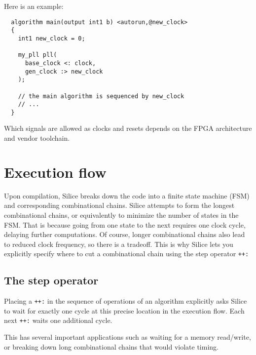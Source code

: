 \documentclass[a4]{article}
\newcommand\silice{Silice}
\begin{document}
Here is an example:
\begin{verbatim}
  algorithm main(output int1 b) <autorun,@new_clock>
  {
    int1 new_clock = 0;

    my_pll pll(
      base_clock <: clock,
      gen_clock :> new_clock
    );

    // the main algorithm is sequenced by new_clock
    // ...
  }
\end{verbatim}

Which signals are allowed as clocks and resets depends on the FPGA architecture
and vendor toolchain.



\section{Execution flow}
\label{sec:execflow}

Upon compilation, \silice{} breaks down the code into a finite state machine (FSM) and corresponding combinational chains.
%
\silice{} attempts to form the longest combinational chains, or equivalently
to minimize the number of states in the FSM. That is because going from one state 
to the next requires one clock cycle, delaying further computations. 
%
Of course, longer combinational chains also lead to reduced clock frequency, so
there is a tradeoff. This is why \silice{} lets you explicitly specify where to cut a combinational chain using the step operator \texttt{++:}

\subsection{The {step} operator}
\label{sec:step}

Placing a \texttt{++:} in the sequence of operations of an algorithm explicitly asks \silice{} to wait for exactly one cycle at this precise location in the execution flow. Each next \texttt{++:} waits one additional cycle.

This has several important applications such as waiting for a memory read/write, or breaking down long combinational chains that would violate timing.



%
%
%
%
% 
\end{document}
